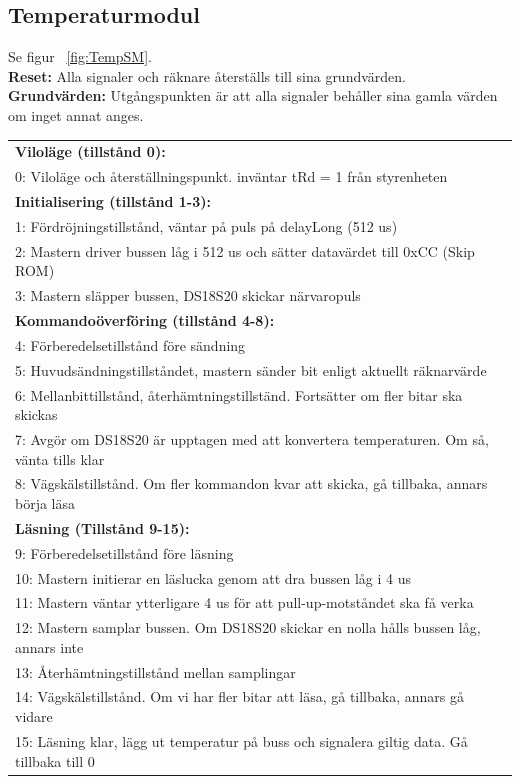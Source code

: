 \documentclass[a4paper,11pt]{article}
\begin{document}
	\pagebreak

		\subsection{Temperaturmodul}
			Se figur ~\ref{fig:TempSM}.\\
			{\bf Reset:} Alla signaler och räknare återställs till sina grundvärden.\\
			{\bf Grundvärden:} Utgångspunkten är att alla signaler behåller sina gamla värden om inget annat anges.\\
			\begin{tabular}{l}
				\\{\bf Viloläge (tillstånd 0):}\\
				0: Viloläge och återställningspunkt. inväntar tRd = 1 från styrenheten\\
				{\bf Initialisering (tillstånd 1-3):}\\
				1: Fördröjningstillstånd, väntar på puls på delayLong (512 us)\\
				2: Mastern driver bussen låg i 512 us och sätter datavärdet till 0xCC (Skip ROM)\\
				3: Mastern släpper bussen, DS18S20 skickar närvaropuls\\
				{\bf Kommandoöverföring (tillstånd 4-8):}\\
				4: Förberedelsetillstånd före sändning\\
				5: Huvudsändningstillståndet, mastern sänder bit enligt aktuellt räknarvärde\\
				6: Mellanbittillstånd, återhämtningstillständ. Fortsätter om fler bitar ska skickas\\
				7: Avgör om DS18S20 är upptagen med att konvertera temperaturen. Om så, vänta tills klar\\
				8: Vägskälstillstånd. Om fler kommandon kvar att skicka, gå tillbaka, annars börja läsa\\
				{\bf Läsning (Tillstånd 9-15):}\\
				9:  Förberedelsetillstånd före läsning\\
				10: Mastern initierar en läslucka genom att dra bussen låg i 4 us\\
				11: Mastern väntar ytterligare 4 us för att pull-up-motståndet ska få verka\\
				12: Mastern samplar bussen. Om DS18S20 skickar en nolla hålls bussen låg, annars inte\\
				13: Återhämtningstillstånd mellan samplingar\\
				14: Vägskälstillstånd. Om vi har fler bitar att läsa, gå tillbaka, annars gå vidare\\
				15: Läsning klar, lägg ut temperatur på buss och signalera giltig data. Gå tillbaka till 0\\
			\end{tabular}
\end{document}
